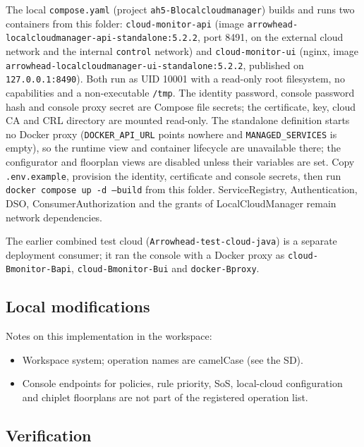\documentclass[a4paper]{arrowhead}
\begin{document}
The local \texttt{compose.yaml} (project \texttt{ah5-{B}localcloudmanager}) builds and runs two containers from this folder: \texttt{cloud-\allowbreak{}monitor-\allowbreak{}api} (image \texttt{arrowhead-\allowbreak{}localcloudmanager-\allowbreak{}api-\allowbreak{}standalone:5.2.2}, port 8491, on the external cloud network and the internal \texttt{control} network) and \texttt{cloud-\allowbreak{}monitor-\allowbreak{}ui} (nginx, image \texttt{arrowhead-\allowbreak{}localcloudmanager-\allowbreak{}ui-\allowbreak{}standalone:5.2.2}, published on \texttt{127.0.0.1:8490}). Both run as UID 10001 with a read-only root filesystem, no capabilities and a non-executable \texttt{/tmp}. The identity password, console password hash and console proxy secret are Compose file secrets; the certificate, key, cloud CA and CRL directory are mounted read-only. The standalone definition starts no Docker proxy (\texttt{DOCKER\_\allowbreak{}API\_\allowbreak{}URL} points nowhere and \texttt{MANAGED\_\allowbreak{}SERVICES} is empty), so the runtime view and container lifecycle are unavailable there; the configurator and floorplan views are disabled unless their variables are set. Copy \texttt{.env.example}, provision the identity, certificate and console secrets, then run \texttt{docker compose up -d --build} from this folder. ServiceRegistry, Authentication, DSO, ConsumerAuthorization and the grants of LocalCloudManager remain network dependencies.

The earlier combined test cloud (\texttt{Arrowhead-test-cloud-java}) is a separate deployment consumer; it ran the console with a Docker proxy as \texttt{cloud-{B}monitor-{B}api}, \texttt{cloud-{B}monitor-{B}ui} and \texttt{docker-{B}proxy}.

\subsection{Local modifications}
\label{sec:local}

Notes on this implementation in the workspace:
\begin{itemize}
  \item Workspace system; operation names are camelCase (see the SD).
  \item Console endpoints for policies, rule priority, SoS, local-cloud configuration and chiplet floorplans are not part of the registered operation list.
\end{itemize}

\subsection{Verification}
\end{document}
